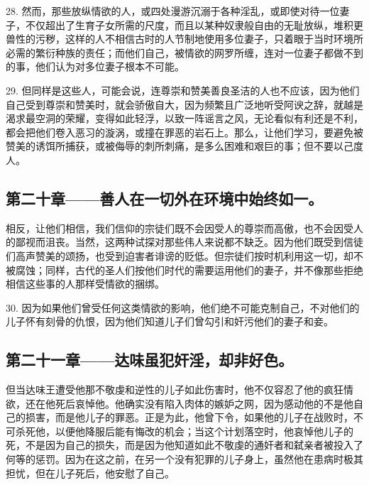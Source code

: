 28. 然而，那些放纵情欲的人，或四处漫游沉溺于各种淫乱，或即使对待一位妻子，不仅超出了生育子女所需的尺度，而且以某种奴隶般自由的无耻放纵，堆积更兽性的污秽，这样的人不相信古时的人节制地使用多位妻子，只着眼于当时环境所必需的繁衍种族的责任；而他们自己，被情欲的网罗所缠，连对一位妻子都做不到的事，他们认为对多位妻子根本不可能。\par

29. 但同样是这些人，可能会说，连尊崇和赞美善良圣洁的人也不应该，因为他们自己受到尊崇和赞美时，就会骄傲自大，因为频繁且广泛地听受阿谀之辞，就越是渴求最空洞的荣耀，变得如此轻浮，以致一阵谣言之风，无论看似有利还是不利，都会把他们卷入恶习的漩涡，或撞在罪恶的岩石上。那么，让他们学习，要避免被赞美的诱饵所捕获，或被侮辱的刺所刺痛，是多么困难和艰巨的事；但不要以己度人。\par


\subsection{第二十章——善人在一切外在环境中始终如一。}

相反，让他们相信，我们信仰的宗徒们既不会因受人的尊崇而高傲，也不会因受人的鄙视而沮丧。当然，这两种试探对那些伟人来说都不缺乏。因为他们既受到信徒们高声赞美的颂扬，也受到迫害者诽谤的贬低。但宗徒们按时机利用这一切，却不被腐蚀；同样，古代的圣人们按他们时代的需要运用他们的妻子，并不像那些拒绝相信这些事的人那样受情欲的捆绑。\par

30. 因为如果他们曾受任何这类情欲的影响，他们绝不可能克制自己，不对他们的儿子怀有刻骨的仇恨，因为他们知道儿子们曾勾引和奸污他们的妻子和妾。\par


\subsection{第二十一章——达味虽犯奸淫，却非好色。}

但当达味王遭受他那不敬虔和逆性的儿子如此伤害时，他不仅容忍了他的疯狂情欲，还在他死后哀悼他。他确实没有陷入肉体的嫉妒之网，因为感动他的不是他自己的损害，而是他儿子的罪恶。正是为此，他曾下令，如果他的儿子在战败时，不可杀死他，以便他降服后能有悔改的机会；当这个计划落空时，他哀悼他儿子的死，不是因为自己的损失，而是因为他知道如此不敬虔的通奸者和弑亲者被投入了何等的惩罚。因为在这之前，在另一个没有犯罪的儿子身上，虽然他在患病时极其担忧，但在儿子死后，他安慰了自己。\par

